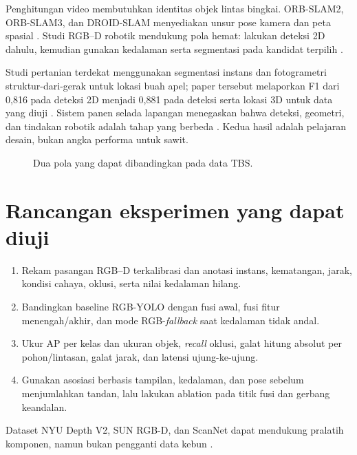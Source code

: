 Penghitungan video membutuhkan identitas objek lintas bingkai. ORB-SLAM2,
ORB-SLAM3, dan DROID-SLAM menyediakan unsur pose kamera dan peta spasial
\cite{murartal2017orbslam2,campos2021orbslam3,teed2021droidslam}. Studi RGB--D
robotik mendukung pola hemat: lakukan deteksi 2D dahulu, kemudian gunakan
kedalaman serta segmentasi pada kandidat terpilih
\cite{elamraoui2024fusionvision,xu2024onboard}.

Studi pertanian terdekat menggunakan segmentasi instans dan fotogrametri
struktur-dari-gerak untuk lokasi buah apel; paper tersebut melaporkan F1 dari
0,816 pada deteksi 2D menjadi 0,881 pada deteksi serta lokasi 3D untuk data yang
diuji \cite{genemola2020fruit3d}. Sistem panen selada lapangan menegaskan bahwa
deteksi, geometri, dan tindakan robotik adalah tahap yang berbeda
\cite{birrell2020lettuce}. Kedua hasil adalah pelajaran desain, bukan angka
performa untuk sawit.

\begin{figure}[htbp]
\centering
{}
\caption{Dua pola yang dapat dibandingkan pada data TBS.}
\label{fig:yolorgbd}
\end{figure}

\section{Rancangan eksperimen yang dapat diuji}

\begin{enumerate}
\item Rekam pasangan RGB--D terkalibrasi dan anotasi instans, kematangan,
      jarak, kondisi cahaya, oklusi, serta nilai kedalaman hilang.
\item Bandingkan baseline RGB-YOLO dengan fusi awal, fusi fitur menengah/akhir,
      dan mode RGB-\textit{fallback} saat kedalaman tidak andal.
\item Ukur AP per kelas dan ukuran objek, \textit{recall} oklusi, galat hitung
      absolut per pohon/lintasan, galat jarak, dan latensi ujung-ke-ujung.
\item Gunakan asosiasi berbasis tampilan, kedalaman, dan pose sebelum menjumlahkan
      tandan, lalu lakukan ablation pada titik fusi dan gerbang keandalan.
\end{enumerate}

Dataset NYU Depth V2, SUN RGB-D, dan ScanNet dapat mendukung pralatih komponen,
namun bukan pengganti data kebun \cite{silberman2012nyu,song2015sunrgbd,dai2017scannet}.

